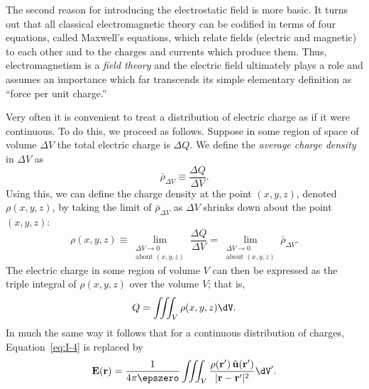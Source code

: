 The second reason for introducing the electrostatic field is more basic. It turns out that all classical electromagnetic theory can be codified in terms of four equations, called Maxwell's equations, which relate fields (electric and magnetic) to each other and to the charges and currents which produce them. Thus, electromagnetism is a \emph{field theory} and the electric field ultimately plays a role and assumes an importance which far transcends its simple elementary definition as ``force per unit charge.''

Very often it is convenient to treat a distribution of electric charge as if it were continuous. To do this, we proceed as follows. Suppose in some region of space of volume $\Delta V$ the total electric charge is $\Delta Q$. We define the \emph{average charge density} in $\Delta V$ as
\begin{equation}
\bar{\rho}_{\Delta V} \equiv \frac{\Delta Q}{\Delta V}.
\label{eq:I-5}
\end{equation}
Using this, we can define the charge density at the point $(x, y, z)$, denoted $\rho(x, y, z)$, by taking the limit of $\bar{\rho}_{\Delta V}$ as $\Delta V$ shrinks down about the point $(x, y, z)$:
\begin{equation}
\rho(x, y, z) \equiv \lim_{\substack{\Delta V \to 0 \\ \text{about } (x,y,z)}} \frac{\Delta Q}{\Delta V} = \lim_{\substack{\Delta V \to 0 \\ \text{about } (x,y,z)}} \bar{\rho}_{\Delta V}.
\label{eq:I-6}
\end{equation}
The electric charge in some region of volume $V$ can then be expressed as the triple integral of $\rho(x, y, z)$ over the volume $V$; that is,
\[
Q = \iiint_V \rho(x, y, z) \dV.
\]
In much the same way it follows that for a continuous distribution of charges, Equation~\eqref{eq:I-4} is replaced by
\begin{equation}
\mathbf{E}(\mathbf{r}) = \frac{1}{4\pi\epszero} \iiint_V \frac{\rho(\mathbf{r}')\,\hat{\mathbf{u}}(\mathbf{r}')}{|\mathbf{r} - \mathbf{r}'|^2} \dV'.
\label{eq:I-7}
\end{equation}

